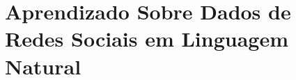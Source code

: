 \documentclass{SBCbookchapter}
\begin{document}







\section{Aprendizado Sobre Dados de Redes Sociais em Linguagem Natural}
\label{sec:aprendizado}
\end{document}
